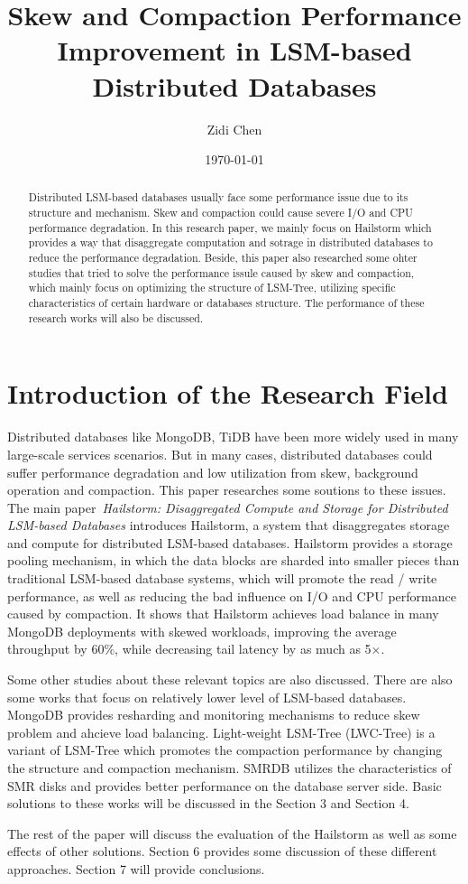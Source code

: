 \documentclass[a4paper,10pt,twoside]{article}
\title{Skew and Compaction Performance Improvement in LSM-based Distributed Databases}
\author{Zidi Chen}
\date{\today}
\begin{document}
\maketitle

\begin{abstract}
	Distributed LSM-based databases usually face some performance issue due to its structure and mechanism.
	Skew and compaction could cause severe I/O and CPU performance degradation.
	In this research paper, we mainly focus on Hailstorm which provides a way that disaggregate computation and sotrage in distributed databases to reduce the performance degradation.
	Beside, this paper also researched some ohter studies that tried to solve the performance issule caused by skew and compaction, which mainly focus on optimizing the structure of LSM-Tree, 
	utilizing specific characteristics of certain hardware or databases structure. 
	The performance of these research works will also be discussed.
\end{abstract}

\tableofcontents

\section{Introduction of the Research Field}

Distributed databases like MongoDB, TiDB have been more widely used in many large-scale services scenarios.
But in many cases, distributed databases could suffer performance degradation and low utilization from skew, background operation and compaction.
This paper researches some soutions to these issues.
The main paper~\textit{Hailstorm: Disaggregated Compute and Storage for Distributed LSM-based Databases} \cite{mainpaper}introduces Hailstorm, a system that disaggregates storage and compute for distributed LSM-based databases.
Hailstorm provides a storage pooling mechanism, in which the data blocks are sharded into smaller pieces than traditional LSM-based database systems, which will promote the read / write performance, 
as well as reducing the bad influence on I/O and CPU performance caused by compaction.
It shows that Hailstorm achieves load balance in many MongoDB deployments with skewed workloads, improving the average throughput by 60$\%$, while decreasing tail latency by as much as 5×.
\par
Some other studies about these relevant topics are also discussed. 
There are also some works that focus on relatively lower level of LSM-based databases.
MongoDB provides resharding and monitoring mechanisms to reduce skew problem and ahcieve load balancing.
Light-weight LSM-Tree (LWC-Tree) is a variant of LSM-Tree which promotes the compaction performance by changing the structure and compaction mechanism.
SMRDB utilizes the characteristics of SMR disks and provides better performance on the database server side.
Basic solutions to these works will be discussed in the Section 3 and Section 4.
\par
The rest of the paper will discuss the evaluation of the Hailstorm as well as some effects of other solutions.
Section 6 provides some discussion of these different approaches.
Section 7 will provide conclusions.
\end{document}
